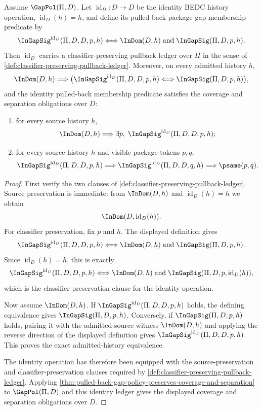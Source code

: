 \begin{theorem}
\label{thm:identity-pullback-gap-policy-unit-law}
Assume $\GapPol(\Pi,D)$. Let $\operatorname{id}_D:D\to D$ be the identity BEDC history operation, $\operatorname{id}_D(h)=h$, and define its pulled-back package-gap membership predicate by
$$
  {\InGapSig}^{\operatorname{id}_D}(\Pi,D,D,p,h)
  \Longleftrightarrow
  \InDom(D,h)\;\text{and}\;\InGapSig(\Pi,D,p,h).
$$
Then $\operatorname{id}_D$ carries a classifier-preserving pullback ledger over $\Pi$ in the sense of \autoref{def:classifier-preserving-pullback-ledger}. Moreover, on every admitted history $h$,
$$
  \InDom(D,h)
  \Longrightarrow
  \bigl({\InGapSig}^{\operatorname{id}_D}(\Pi,D,D,p,h)
  \Longleftrightarrow
  \InGapSig(\Pi,D,p,h)\bigr),
$$
and the identity pulled-back membership predicate satisfies the coverage and separation obligations over $D$:
\begin{enumerate}
  \item for every source history $h$,
  $$
    \InDom(D,h)\Longrightarrow\exists p,\;{\InGapSig}^{\operatorname{id}_D}(\Pi,D,D,p,h);
  $$
  \item for every source history $h$ and visible package tokens $p,q$,
  $$
    {\InGapSig}^{\operatorname{id}_D}(\Pi,D,D,p,h)
    \Longrightarrow
    {\InGapSig}^{\operatorname{id}_D}(\Pi,D,D,q,h)
    \Longrightarrow
    \psame(p,q).
  $$
\end{enumerate}
\end{theorem}

\begin{proof}
First verify the two clauses of \autoref{def:classifier-preserving-pullback-ledger}. Source preservation is immediate: from $\InDom(D,h)$ and $\operatorname{id}_D(h)=h$ we obtain
$$
  \InDom(D,\operatorname{id}_D(h)).
$$
For classifier preservation, fix $p$ and $h$. The displayed definition gives
$$
  {\InGapSig}^{\operatorname{id}_D}(\Pi,D,D,p,h)
  \Longleftrightarrow
  \InDom(D,h)\;\text{and}\;\InGapSig(\Pi,D,p,h).
$$
Since $\operatorname{id}_D(h)=h$, this is exactly
$$
  {\InGapSig}^{\operatorname{id}_D}(\Pi,D,D,p,h)
  \Longleftrightarrow
  \InDom(D,h)\;\text{and}\;\InGapSig(\Pi,D,p,\operatorname{id}_D(h)),
$$
which is the classifier-preservation clause for the identity operation.

Now assume $\InDom(D,h)$. If ${\InGapSig}^{\operatorname{id}_D}(\Pi,D,D,p,h)$ holds, the defining equivalence gives $\InGapSig(\Pi,D,p,h)$. Conversely, if $\InGapSig(\Pi,D,p,h)$ holds, pairing it with the admitted-source witness $\InDom(D,h)$ and applying the reverse direction of the displayed definition gives ${\InGapSig}^{\operatorname{id}_D}(\Pi,D,D,p,h)$. This proves the exact admitted-history equivalence.

The identity operation has therefore been equipped with the source-preservation and classifier-preservation clauses required by \autoref{def:classifier-preserving-pullback-ledger}. Applying \autoref{thm:pulled-back-gap-policy-preserves-coverage-and-separation} to $\GapPol(\Pi,D)$ and this identity ledger gives the displayed coverage and separation obligations over $D$.
\end{proof}

